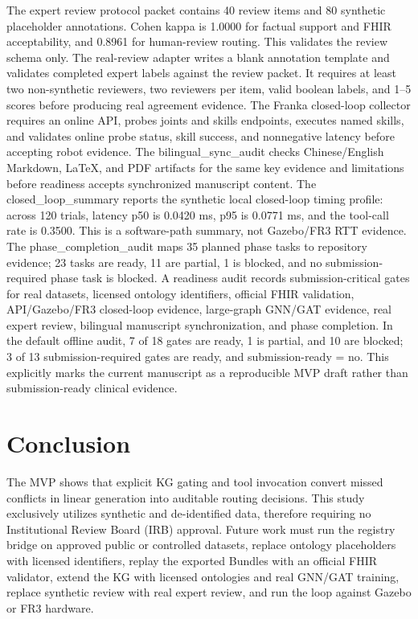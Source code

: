 \documentclass[11pt]{article}
\begin{document}
The expert review protocol packet contains 40 review items and 80 synthetic placeholder annotations. Cohen kappa is 1.0000 for factual support and FHIR acceptability, and 0.8961 for human-review routing. This validates the review schema only.
The real-review adapter writes a blank annotation template and validates completed expert labels against the review packet. It requires at least two non-synthetic reviewers, two reviewers per item, valid boolean labels, and 1--5 scores before producing real agreement evidence.
The Franka closed-loop collector requires an online API, probes joints and skills endpoints, executes named skills, and validates online probe status, skill success, and nonnegative latency before accepting robot evidence.
The bilingual\_sync\_audit checks Chinese/English Markdown, LaTeX, and PDF artifacts for the same key evidence and limitations before readiness accepts synchronized manuscript content.
The closed\_loop\_summary reports the synthetic local closed-loop timing profile: across 120 trials, latency p50 is 0.0420 ms, p95 is 0.0771 ms, and the tool-call rate is 0.3500. This is a software-path summary, not Gazebo/FR3 RTT evidence.
The phase\_completion\_audit maps 35 planned phase tasks to repository evidence; 23 tasks are ready, 11 are partial, 1 is blocked, and no submission-required phase task is blocked.
A readiness audit records submission-critical gates for real datasets, licensed ontology identifiers, official FHIR validation, API/Gazebo/FR3 closed-loop evidence, large-graph GNN/GAT evidence, real expert review, bilingual manuscript synchronization, and phase completion. In the default offline audit, 7 of 18 gates are ready, 1 is partial, and 10 are blocked; 3 of 13 submission-required gates are ready, and submission-ready = no. This explicitly marks the current manuscript as a reproducible MVP draft rather than submission-ready clinical evidence.

\section{Conclusion}
The MVP shows that explicit KG gating and tool invocation convert missed conflicts in linear generation into auditable routing decisions. This study exclusively utilizes synthetic and de-identified data, therefore requiring no Institutional Review Board (IRB) approval. Future work must run the registry bridge on approved public or controlled datasets, replace ontology placeholders with licensed identifiers, replay the exported Bundles with an official FHIR validator, extend the KG with licensed ontologies and real GNN/GAT training, replace synthetic review with real expert review, and run the loop against Gazebo or FR3 hardware.

\nocite{*}


\end{document}
